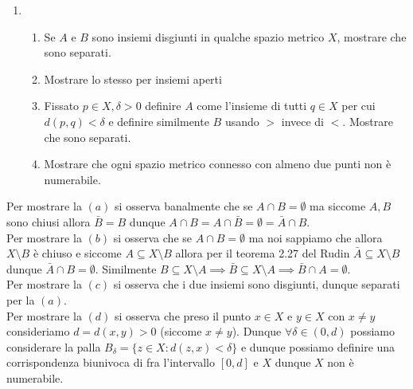 \documentclass{report}
\begin{document}
\begin{enumerate}[resume, label=\protect\circled{\arabic*}]
	\item \begin{enumerate}
		\item Se $A$ e $B$ sono insiemi disgiunti in qualche spazio metrico $X$, mostrare che sono separati.
		\item Mostrare lo stesso per insiemi aperti
		\item Fissato $p \in X, \delta > 0$ definire $A$ come l'insieme di tutti $q \in X$ per cui $d(p, q) < \delta$ e definire similmente $B$ usando $>$ invece di $<$. Mostrare che sono separati.
		\item Mostrare che ogni spazio metrico connesso con almeno due punti non è numerabile.
	\end{enumerate}
\end{enumerate}
\begin{mysolution}
Per mostrare la $(a)$ si osserva banalmente che se $A \cap B = \emptyset$ ma siccome $A, B$ sono chiusi allora $\bar{B} = B$ dunque $A \cap B = A \cap \bar{B} = \emptyset = \bar{A} \cap B$. \\
Per mostrare la $(b)$ si osserva che se $A \cap B = \emptyset$ ma noi sappiamo che allora $X \setminus B$ è chiuso e siccome $A \subseteq X \setminus B$ allora per il teorema 2.27 del Rudin $\bar{A} \subseteq X \setminus B$ dunque $\bar{A} \cap B = \emptyset$. Similmente $B \subseteq X \setminus A \implies \bar{B} \subseteq X \setminus A \implies \bar{B} \cap A = \emptyset$. \\
Per mostrare la $(c)$ si osserva che i due insiemi sono disgiunti, dunque separati per la $(a)$. \\
Per mostrare la $(d)$ si osserva che preso il punto $x \in X$ e $y \in X$ con $x \neq y$ consideriamo $d = d(x, y) > 0$ (siccome $x \neq y$). Dunque $\forall \delta \in (0, d)$ possiamo considerare la palla $B_\delta = \{ z \in X : d(z, x) < \delta \}$ e dunque possiamo definire una corrispondenza biunivoca di fra l'intervallo $[0, d]$ e $X$ dunque $X$ non è numerabile.
\end{mysolution}
\end{document}
